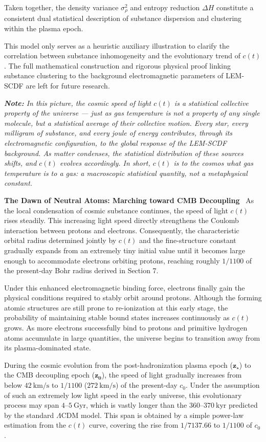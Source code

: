 \documentclass[12pt,leqno]{article}
\begin{document}
{	\medskip
	Taken together, the density variance $\sigma^2_\rho$ and entropy reduction $\Delta H$ constitute a consistent dual statistical description of substance dispersion and clustering within the plasma epoch.
	
	\bigskip
	This model only serves as a heuristic auxiliary illustration to clarify the correlation between substance inhomogeneity and the evolutionary trend of $c(t)$. The full mathematical construction and rigorous physical proof linking substance clustering to the background electromagnetic parameters of LEM-SCDF are left for future research.
	
	\medskip
	\textit{\textbf{Note:} In this picture, the cosmic speed of light \(c(t)\) is a statistical collective property of the universe — just as gas temperature is not a property of any single molecule, but a statistical average of their collective motion. Every star, every milligram of substance, and every joule of energy contributes, through its electromagnetic configuration, to the global response of the LEM-SCDF background. As matter condenses, the statistical distribution of these sources shifts, and \(c(t)\) evolves accordingly. In short, \(c(t)\) is to the cosmos what gas temperature is to a gas: a macroscopic statistical quantity, not a metaphysical constant.}
	
	
	\medskip
	\bigskip
	\textbf{The Dawn of Neutral Atoms: Marching toward CMB Decoupling}\,\,\,
	As the local condensation of cosmic substance continues, the speed of light $c(t)$ rises steadily. This increasing light speed directly strengthens the Coulomb interaction between protons and electrons. Consequently, the characteristic orbital radius determined jointly by $c(t)$ and the fine-structure constant gradually expands from an extremely tiny initial value until it becomes large enough to accommodate electrons orbiting protons, reaching roughly $1/1100$ of the present-day Bohr radius derived in Section 7.
	
	\medskip
	Under this enhanced electromagnetic binding force, electrons finally gain the physical conditions required to stably orbit around protons. Although the forming atomic structures are still prone to re-ionization at this early stage, the probability of maintaining stable bound states increases continuously as $c(t)$ grows. As more electrons successfully bind to protons and primitive hydrogen atoms accumulate in large quantities, the universe begins to transition away from its plasma-dominated state. 
	
	\medskip
	During the cosmic evolution from the post-hadronization plasma epoch ($\boldsymbol{z_{\star}}$) to the CMB decoupling epoch ($\boldsymbol{z_{0}}$), the speed of light gradually increases from below $42\ \mathrm{km/s}$ to $1/1100$ ($272\ \mathrm{km/s}$) of the present-day $c_0$. Under the assumption of such an extremely low light speed in the early universe, this evolutionary process may span $4$--$5\ \mathrm{Gyr}$, which is vastly longer than the $360$--$370\ \mathrm{kyr}$ predicted by the standard $\Lambda$CDM model. This span is obtained by a simple power-law estimation from the $c(t)$ curve, covering the rise from $1/7137.66$ to $1/1100$ of $c_0$. 
	
}
\end{document}
